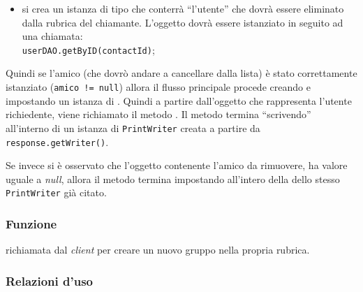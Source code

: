 \begin{description}
\begin{itemize}
		\item si crea un istanza di tipo  che conterrà ``l'utente'' che dovrà essere eliminato dalla rubrica del chiamante. L'oggetto dovrà essere istanziato in seguito ad una chiamata:\\
		\verb|userDAO.getByID(contactId)|;
	\end{itemize}
	Quindi se l'amico (che dovrò andare a cancellare dalla lista) è stato correttamente istanziato (\texttt{amico != null}) allora il flusso principale procede creando e impostando un istanza di . Quindi a partire dall'oggetto che rappresenta l'utente richiedente, viene richiamato il metodo . Il metodo termina ``scrivendo''  all'interno di un istanza di \texttt{PrintWriter} creata a partire da \texttt{response.getWriter()}.
	
	Se invece si è osservato che l'oggetto contenente l'amico da rimuovere, ha valore uguale a \textit{null}, allora il metodo termina impostando  all'intero della dello stesso \texttt{PrintWriter} già citato.
\end{description}



\subsubsection*{Funzione}
 richiamata dal \textit{client} per creare un nuovo gruppo nella propria rubrica.

\subsubsection*{Relazioni d'uso}

